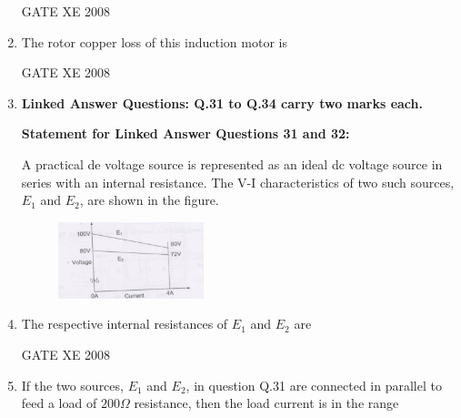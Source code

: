 \documentclass[12pt]{article}
\begin{document}
\begin{enumerate}[label=Q\arabic*.]
GATE XE 2008
\item  The rotor copper loss of this induction motor is

\begin{enumerate}[label=(\Alph*)]
\end{enumerate}

GATE XE 2008
\item[]\textbf{\Large Linked Answer Questions: Q.31 to Q.34 carry two marks each.}

\textbf{Statement for Linked Answer Questions 31 and 32:}

A practical de voltage source is represented as an ideal dc voltage source in series with an internal
resistance. The V-I characteristics of two such sources, $E_{1}$ and $E_{2}$, are shown in the figure.

\begin{figure}[H]
  \centering
  \includegraphics[width=0.4\textwidth]{figs/q31.png}
  \caption{}
\end{figure}

\item  The respective internal resistances of $E_{1}$ and $E_{2}$ are

\begin{enumerate}[label=(\Alph*)]
\end{enumerate}

GATE XE 2008
\item  If the two sources, $E_{1}$ and $E_{2}$, in question Q.31 are connected in parallel to feed a load of $200\Omega$ resistance, then the load current is in the range


\end{enumerate}
\end{document}

